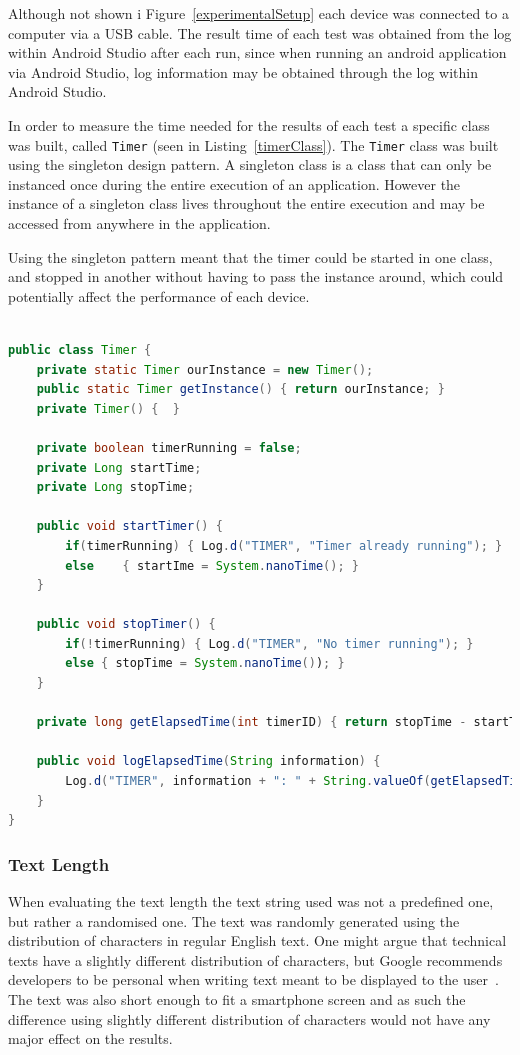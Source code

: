 Although not shown i Figure~\ref{experimentalSetup} each device was connected to a computer via a USB cable. The result time of each test was obtained from the log within Android Studio after each run, since when running an android application via Android Studio, log information may be obtained through the log within Android Studio.

In order to measure the time needed for the results of each test a specific class was built, called \texttt{Timer} (seen in Listing~\ref{timerClass}). The \texttt{Timer} class was built using the singleton design pattern. A singleton class is a class that can only be instanced once during the entire execution of an application. However the instance of a singleton class lives throughout the entire execution and may be accessed from anywhere in the application.

Using the singleton pattern meant that the timer could be started in one class, and stopped in another without having to pass the instance around, which could potentially affect the performance of each device.

\begin{lstlisting}[language=Java, caption={The Timer class}, label=timerClass]

public class Timer {
	private static Timer ourInstance = new Timer();
	public static Timer getInstance() { return ourInstance; }
	private Timer() {  }
	
	private boolean timerRunning = false;
	private Long startTime;
	private Long stopTime;
	
	public void startTimer() { 
		if(timerRunning) { Log.d("TIMER", "Timer already running"); }
		else 	{ startIme = System.nanoTime(); }
	}
	
	public void stopTimer() {
		if(!timerRunning) { Log.d("TIMER", "No timer running"); }
		else { stopTime = System.nanoTime()); }
	}
	
	private long getElapsedTime(int timerID) { return stopTime - startTime; }
	
	public void logElapsedTime(String information) {
		Log.d("TIMER", information + ": " + String.valueOf(getElapsedTime() + " nano seconds");
	}
}
\end{lstlisting}

\subsubsection{Text Length}
When evaluating the text length the text string used was not a predefined one, but rather a randomised one. The text was randomly generated using the distribution of characters in regular English text. One might argue that technical texts have a slightly different distribution of characters, but Google recommends developers to be personal when writing text meant to be displayed to the user~\cite{glassDesignStyle}. The text was also short enough to fit a smartphone screen and as such the difference using slightly different distribution of characters would not have any major effect on the results.

